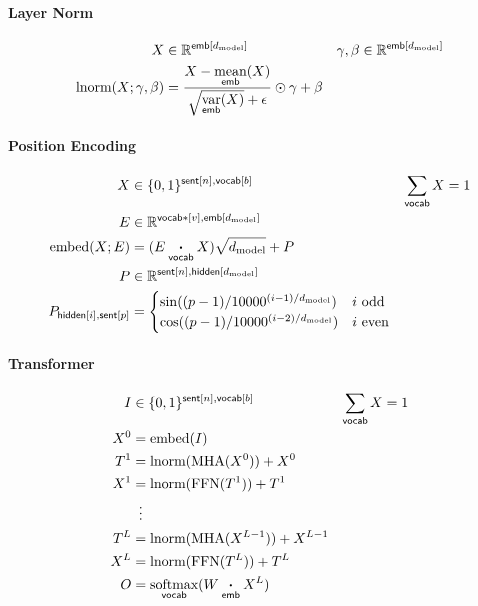 \documentclass{article}
\newcommand{\reals}[0]{\mathbb{R}}
\newcommand{\dmodel}{d_{\text{model}}}
\begin{document}
\paragraph{Layer Norm}

\begin{align*} 
X &\in \reals^{\nset{emb}{\dmodel}} & \gamma, \beta &\in \reals^{\nset{emb}{\dmodel}} \\
\text{lnorm}(X; \gamma, \beta) &= \frac{X - \nfun{emb}{\text{mean}}(X)}{\sqrt{\nfun{emb}{\text{var}}(X)} + \epsilon} \odot \gamma + \beta 
\end{align*}

\paragraph{Position Encoding}
\begin{align*} 
X &\in \{0, 1\}^{\nset{sent}{n}, \nset{vocab}{b}} & \nsum{vocab} X &= 1\\
E &\in \reals^{\nset{vocab*}{v}, \nset{emb}{\dmodel}} \\
\text{embed}(X; E) &= (E \ndot{vocab} X)\sqrt{\dmodel} + P \\
P &\in \reals^{\nset{sent}{n}, \nset{hidden}{\dmodel}} \\
P_{\nidx{hidden}{i}, \nidx{sent}{p}} &= \begin{cases}
  \sin((p-1) / 10000^{(i-1) / \dmodel}) & \text{$i$ odd} \\ 
  \cos((p-1) / 10000^{(i-2) / \dmodel}) & \text{$i$ even} \\
\end{cases} \\
\end{align*}

\paragraph{Transformer}

\begin{align*} 
I &\in \{0, 1\}^{{\nset{sent}{n}, \nset{vocab}{b}}} & \nsum{vocab} X &= 1\\
X^0 &= \text{embed}(I)\\
T^1 &= \text{lnorm}(\text{MHA}(X^0)) + X^0\\
X^1 &= \text{lnorm}(\text{FFN}(T^1)) + T^1\\
&\vdotswithin{=} \\
T^{L} &= \text{lnorm}(\text{MHA}(X^{L-1})) + X^{L-1}\\
X^{L} &= \text{lnorm}(\text{FFN}(T^L)) + T^L\\
O &= \nfun{vocab}{softmax}(W \ndot{emb} X^L)
\end{align*}


\end{document}
